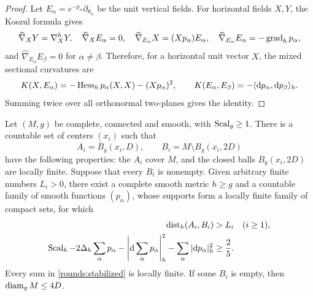 \begin{proof}
Let \(E_\alpha=e^{-p_\alpha}\partial_{\theta_\alpha}\) be the unit
vertical fields. For horizontal fields \(X,Y\), the Koszul formula gives
\[
 \widehat\nabla_XY=\nabla^h_XY,\quad
 \widehat\nabla_XE_\alpha=0,\quad
 \widehat\nabla_{E_\alpha}X=(Xp_\alpha)E_\alpha,\quad
 \widehat\nabla_{E_\alpha}E_\alpha=-\operatorname{grad}_h p_\alpha,
\]
and \(\widehat\nabla_{E_\alpha}E_\beta=0\) for \(\alpha\ne\beta\).
Therefore, for a horizontal unit vector \(X\), the mixed sectional
curvatures are
\[
 K(X,E_\alpha)=-\operatorname{Hess}_h p_\alpha(X,X)-(Xp_\alpha)^2,
 \qquad
 K(E_\alpha,E_\beta)=-\langle\mathrm d p_\alpha,\mathrm d p_\beta\rangle_h.
\]
Summing twice over all orthonormal two-planes gives the identity.
\end{proof}

\begin{theorem}\label{rounds:wide}
Let \((M,g)\) be complete, connected and smooth, with
\(\operatorname{Scal}_g\ge1\). There is a countable set of centers \((x_i)\) such that
\[
 A_i=\overline B_g(x_i,D),\qquad
 B_i=M\setminus B_g(x_i,2D)
\]
have the following properties: the \(A_i\) cover \(M\), and the closed
balls \(\overline B_g(x_i,2D)\) are locally finite. Suppose that every
\(B_i\) is nonempty. Given arbitrary finite numbers \(L_i>0\), there
exist a complete smooth metric \(h\ge g\) and a countable family of
smooth functions \((p_\alpha)\), whose supports form a locally finite
family of compact sets, for which
\begin{align}
 \operatorname{dist}_h(A_i,B_i)&>L_i \quad(i\ge1),\label{rounds:prescribed}\\
 \operatorname{Scal}_h-2\Delta_h\sum_\alpha p_\alpha
       -\left|\mathrm d\sum_\alpha p_\alpha\right|_h^2
       -\sum_\alpha|\mathrm d p_\alpha|_h^2&\ge\frac25.\label{rounds:stabilized}
\end{align}
Every sum in \eqref{rounds:stabilized} is locally finite. If some
\(B_i\) is empty, then \(\operatorname{diam}_g M\le4D\).
\end{theorem}

